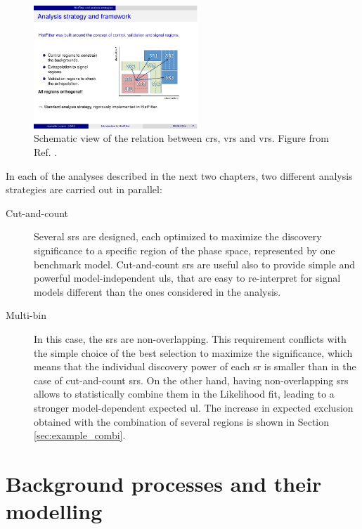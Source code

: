 \begin{figure}
\centering
\includegraphics[width=0.55\textwidth]{figures/susy_common/CR_VR}
\caption{Schematic view of the relation between \glspl{cr}, \glspl{vr} and \glspl{vr}. Figure from Ref. \cite{Baak:2014wma}.}
\label{fig:susy_common:CRschema}
\end{figure}
 
In each of the analyses described in the next two chapters, two different analysis strategies are carried out in parallel:
\begin{description}
\item[Cut-and-count] Several \glspl{sr} are designed, each optimized to maximize the discovery significance to a specific region of the phase space, represented by one benchmark model. Cut-and-count \glspl{sr} are useful also to provide simple and powerful model-independent \glspl{ul}, that are easy to re-interpret for signal models different than the ones considered in the analysis. 

\item[Multi-bin] In this case, the \glspl{sr} are non-overlapping. This requirement conflicts with the simple choice of the best selection to maximize the significance, which means that the individual discovery power of each \gls{sr} is smaller than in the case of cut-and-count \glspl{sr}. On the other hand, having non-overlapping \glspl{sr} allows to statistically combine them in the Likelihood fit, leading to a stronger model-dependent expected \gls{ul}. The increase in expected exclusion obtained with the combination of several regions is shown in Section \ref{sec:example_combi}.
 
\end{description}



\section{Background processes and their modelling}
\label{sec:common_backgrounds}

